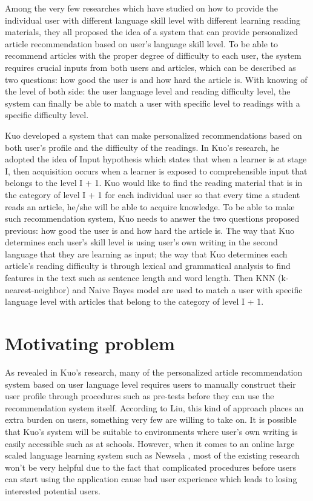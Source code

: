 Among the very few researches which have studied on how to provide the individual user with different language skill level with different learning reading materials, they all proposed the idea of a system that can provide personalized article recommendation based on user's language skill level. To be able to recommend articles with the proper degree of difficulty to each user, the system requires crucial inputs from both users and articles, which can be described as two questions: how good the user is and how hard the article is. With knowing of the level of both side: the user language level and reading difficulty level, the system can finally be able to match a user with specific level to readings with a specific difficulty level. 

Kuo \cite{Kuo2014} developed a system that can make personalized recommendations based on both user's profile and the difficulty of the readings. In Kuo's research, he adopted the idea of Input hypothesis \cite{Ostendorf2005} which states that when a learner is at stage I, then acquisition occurs when a learner is exposed to comprehensible input that belongs to the level I + 1. Kuo would like to find the reading material that is in the category of level I + 1 for each individual user so that every time a student reads an article, he/she will be able to acquire knowledge. To be able to make such recommendation system, Kuo needs to answer the two questions proposed previous: how good the user is and how hard the article is. The way that Kuo determines each user's skill level is using user's own writing in the second language that they are learning as input; the way that Kuo determines each article's reading difficulty is through lexical and grammatical analysis to find features in the text such as sentence length and word length. Then KNN (k-nearest-neighbor) and Naive Bayes model are used to match a user with specific language level with articles that belong to the category of level I + 1. 

\section{Motivating problem}

As revealed in Kuo's research, many of the personalized article recommendation system \cite{Hwang2010, Hwang2008, Kuo2014} based on user language level requires users to manually construct their user profile through procedures such as pre-tests before they can use the recommendation system itself. According to Liu, this kind of approach places an extra burden on users, something very few are willing to take on. It is possible that Kuo's system will be suitable to environments where user's own writing is easily accessible such as at schools. However, when it comes to an online large scaled language learning system such as Newsela \cite{Newsela}, most of the existing research won't be very helpful due to the fact that complicated procedures before users can start using the application cause bad user experience which leads to losing interested potential users. 

